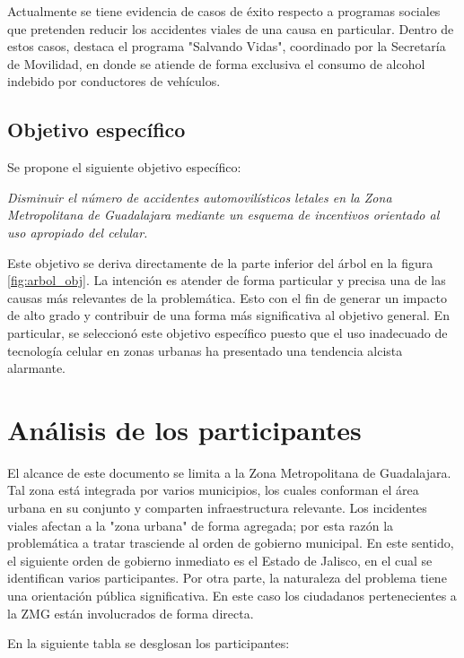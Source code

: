 \documentclass{article}
\newcommand{\forceindent}{\leavevmode{\parindent=1em\indent}}
\begin{document}
Actualmente se tiene evidencia de casos de éxito respecto a programas sociales que pretenden reducir los accidentes viales de una causa en particular. Dentro de estos casos, destaca el programa "Salvando Vidas", coordinado por la Secretaría de Movilidad, en donde se atiende de forma exclusiva el consumo de alcohol indebido por conductores de vehículos.

\subsection{Objetivo específico}\label{subsec:specific-objs}

Se propone el siguiente objetivo específico:

\forceindent \textit{Disminuir el número de accidentes automovilísticos letales en la Zona Metropolitana de Guadalajara mediante un esquema de incentivos orientado al uso apropiado del celular.}

Este objetivo se deriva directamente de la parte inferior del árbol en la figura \ref{fig:arbol_obj}. La intención es atender de forma particular y precisa una de las causas más relevantes de la problemática. Esto con el fin de generar un impacto de alto grado y contribuir de una forma más significativa al objetivo general. En particular, se seleccionó este objetivo específico puesto que el uso inadecuado de tecnología celular en zonas urbanas ha presentado una tendencia alcista alarmante.


\newpage
\section{Análisis de los participantes}\label{sec:participants}

El alcance de este documento se limita a la Zona Metropolitana de Guadalajara. Tal zona está integrada por varios municipios, los cuales conforman el área urbana en su conjunto y comparten infraestructura relevante. Los incidentes viales afectan a la "zona urbana" de forma agregada; por esta razón la problemática a tratar trasciende al orden de gobierno municipal. En este sentido, el siguiente orden de gobierno inmediato es el Estado de Jalisco, en el cual se identifican varios participantes. Por otra parte, la naturaleza del problema tiene una orientación pública significativa. En este caso los ciudadanos pertenecientes a la ZMG están involucrados de forma directa. 

En la siguiente tabla se desglosan los participantes:
\end{document}
